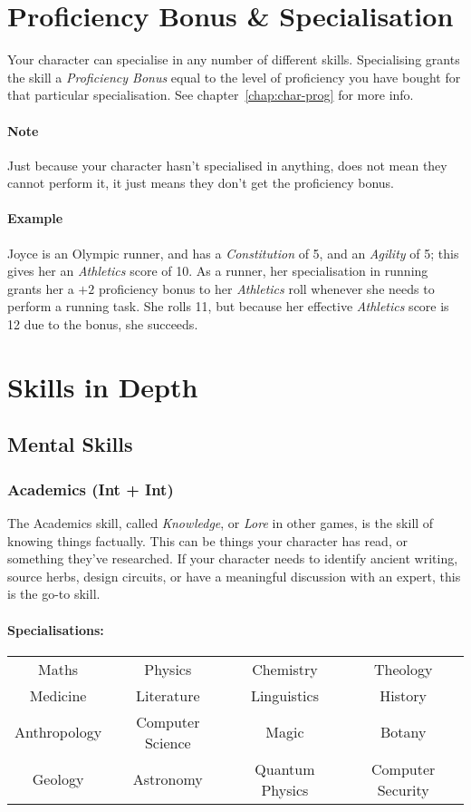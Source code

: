 \section{Proficiency Bonus \& Specialisation}
Your character can specialise in any number of different skills.
Specialising grants the skill a \textit{Proficiency Bonus} equal to the level of proficiency you have bought for that particular specialisation.
See chapter~\ref{chap:char-prog} for more info.

\paragraph{Note} Just because your character hasn't specialised in anything, does not mean they cannot perform it, it just means they don't get the proficiency bonus.

\paragraph{Example} Joyce is an Olympic runner, and has a \textit{Constitution} of 5, and an \textit{Agility} of 5; this gives her an \textit{Athletics} score of 10. 
As a runner, her specialisation in running grants her a $+2$ proficiency bonus to her \textit{Athletics} roll whenever she needs to perform a running task.
She rolls 11, but because her effective \textit{Athletics} score is 12 due to the bonus, she succeeds.

\newpage
\section{Skills in Depth}
\subsection{Mental Skills}
\subsubsection{Academics (Int + Int)}
The Academics skill, called \textit{Knowledge}, or \textit{Lore} in other games, is the skill of knowing things factually. 
This can be things your character has read, or something they've researched.
If your character needs to identify ancient writing, source herbs, design circuits, or have a meaningful discussion with an expert, this is the go-to skill.

\paragraph{Specialisations:}
\begin{center}
    \begin{tabular}{c|c|c|c}
        Maths & Physics & Chemistry & Theology \\
        Medicine & Literature & Linguistics & History \\
        Anthropology & Computer Science & Magic & Botany \\
        Geology & Astronomy & Quantum Physics & Computer Security \\
    \end{tabular}
\end{center}

